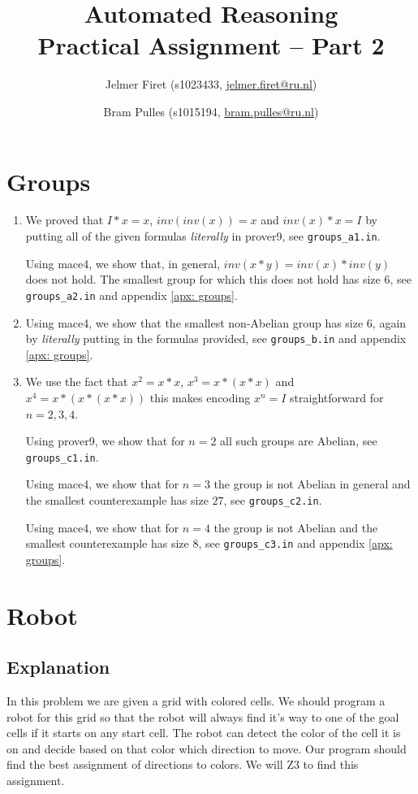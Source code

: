 \documentclass{scrartcl}
\author{Jelmer Firet (s1023433, \href{mailto:jelmer.firet@ru.nl}{jelmer.firet@ru.nl}) \and
Bram Pulles (s1015194, \href{mailto:bram.pulles@ru.nl}{bram.pulles@ru.nl})}
\title{\textbf{Automated Reasoning\\Practical Assignment -- Part 2}}
\begin{document}
\maketitle

\section{Groups} %
\label{sec:groups}
\begin{enumerate}[label=\alph*)]
\item
	We proved that $I*x=x$, $inv(inv(x))=x$ and $inv(x)*x=I$ by putting all of
	the given formulas \textit{literally} in prover9, see
	\texttt{groups\_a1.in}.

	Using mace4, we show that, in general, $inv(x*y)=inv(x)*inv(y)$ does not
	hold. The smallest group for which this does not hold has size $6$, see
	\texttt{groups\_a2.in} and appendix \ref{apx: groups}.
\item
	Using mace4, we show that the smallest non-Abelian group has size $6$,
	again by \textit{literally} putting in the formulas provided, see
	\texttt{groups\_b.in} and appendix \ref{apx: groups}.
\item
	We use the fact that $x^2 = x * x$, $x^3 = x * (x * x)$ and $x^4 = x * (x *
	(x * x))$ this makes encoding $x^n = I$ straightforward for $n = 2, 3, 4$.

	Using prover9, we show that for $n=2$ all such groups are Abelian, see \texttt{groups\_c1.in}.

	Using mace4, we show that for $n=3$ the group is not Abelian in general and
	the smallest counterexample has size $27$, see \texttt{groups\_c2.in}.

	Using mace4, we show that for $n=4$ the group is not Abelian and the
	smallest counterexample has size $8$, see \texttt{groups\_c3.in} and
	appendix \ref{apx: groups}.
\end{enumerate}

\section{Robot} %
\label{sec:robot}

	\subsection{Explanation} %
	\label{sub:explanation}
	In this problem we are given a grid with colored cells. We should program a robot for this grid so that the robot will always find it's way to one of the goal cells if it starts on any start cell.
	The robot can detect the color of the cell it is on and decide based on that color which direction to move. Our program should find the best assignment of directions to colors. We will Z3 to find this assignment.
\end{document}

